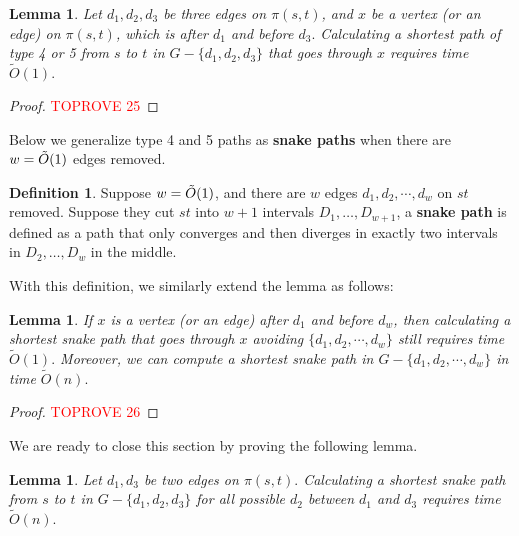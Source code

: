 \documentclass[11pt]{article}
\theoremstyle{plain}
\newtheorem{lemma}[theorem]{Lemma}
\theoremstyle{definition}
\newtheorem{definition}[theorem]{Definition}
\newcommand{\too}[1]{\tilde{O}({#1})}
\begin{document}
\begin{lemma}\label{lemma:snake3}
    Let $d_1,d_2,d_3$ be three edges on $\pi(s,t)$, and $x$ be a vertex (or an edge) on $\pi(s,t)$, which is after $d_1$ and before $d_3.$ Calculating a shortest path of type 4 or 5 from $s$ to $t$ in $G-\{d_1,d_2,d_3\}$ that goes through $x$ requires time $\too{1}.$ 
\end{lemma}

\begin{proof}\textcolor{red}{TOPROVE 25}\end{proof}

Below we generalize type 4 and 5 paths as  \textbf{snake paths} when there are $w=\Tilde{O}(1)$ edges removed.

\begin{definition}

Suppose $w=\Tilde{O}(1)$, and there are $w$ edges $d_1,d_2,\cdots,d_w$ on $st$ removed. Suppose they cut $st$ into $w+1$ intervals $D_1, \dots , D_{w+1}$, a \textbf{snake path} is defined as a path that only converges and then diverges in exactly two intervals in $D_2, \dots, D_w$ in the middle. 

\end{definition}

With this definition, we similarly extend the lemma as follows:



\begin{lemma}\label{lemma:snake}
    If $x$ is a vertex (or an edge) after $d_1$ and before $d_w$, then calculating a shortest snake path that goes through $x$ avoiding $\{d_1,d_2,\cdots,d_w\}$ still requires time $\too{1}.$ Moreover, we can compute a shortest snake path in $G-\{d_1,d_2,\cdots,d_w\}$ in time $\too{n}.$
\end{lemma}





\begin{proof}\textcolor{red}{TOPROVE 26}\end{proof}
    







We are ready to close this section by proving the following lemma.
\begin{lemma}\label{thm1-5}
    Let $d_1,d_3$ be two edges on $\pi(s,t).$ Calculating a shortest snake path from $s$ to $t$ in $G-\{d_1,d_2,d_3\}$ for all possible $d_2$ between $d_1$ and $d_3$ requires time $\too{n}.$
\end{lemma}
\end{document}

